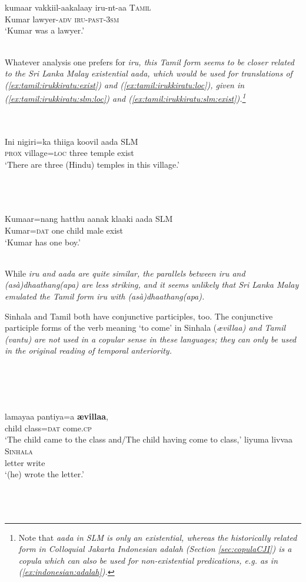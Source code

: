 \documentclass[a4paper,12pt]{article}
\newcommand{\xbox}[2]{\noindent\parbox[t]{#1}{#2}\noindent}
\newcommand{\xref}[1]{(\ref{#1})}
\newcommand{\ea}{\\\\}
\newcommand{\z}{\\\\}
\begin{document}
\xbox{\textwidth}{
\ea\label{ex:tamil:irukkiratu:adv}
\gll kumaar vakkiil-aakalaay iru-nt-aa\textipa{\textsubbar{n}} \textsc{Tamil} \\
      Kumar lawyer-\textsc{adv} \textsc{iru}-\textsc{past}-\textsc{3sm}\\
    `Kumar was a lawyer.' \citep[174]{Lehmann1989tamil}
\z
} 

Whatever analysis one prefers for \em iru\em, this Tamil form seems to be closer related to the Sri Lanka Malay existential \em aada\em, which would be used for translations of \xref{ex:tamil:irukkiratu:exist} and \xref{ex:tamil:irukkiratu:loc}, given in \xref{ex:tamil:irukkiratu:slm:loc} and \xref{ex:tamil:irukkiratu:slm:exist}.\footnote{Note that \em aada \em in SLM is only an existential, whereas the historically related form in Colloquial Jakarta Indonesian \em adalah \em (Section \ref{sec:copulaCJI}) is a copula which can also be used for non-existential predications, e.g. as in \xref{ex:indonesian:adalah}.}


\xbox{\textwidth}{
\ea\label{ex:tamil:irukkiratu:slm:loc}
\gll Ini nigiri=ka thiiga koovil aada \textsc{SLM} \\
     \textsc{prox} village=\textsc{loc} three temple exist  \\
    `There are three (Hindu) temples in this village.'
\z
} 


\xbox{\textwidth}{
\ea\label{ex:tamil:irukkiratu:slm:exist}
\gll  Kumaar=nang hatthu aanak klaaki aada \textsc{SLM} \\
      Kumar=\textsc{dat} one child male exist \\
    `Kumar has one boy.' 
\z
} 

While \em iru \em and \em aada \em are quite similar, the parallels between \em iru \em and \em (asà)dhaathang(apa) \em are less striking, and it seems unlikely that Sri Lanka Malay emulated the Tamil form \em iru \em with \em (asà)dhaa\-thang(apa).\em

Sinhala and Tamil both have conjunctive participles, too. The conjunctive participle forms of the verb meaning `to come' in Sinhala (\em \ae villaa\em) and Tamil (\em vantu\em) are not used in a copular sense in these languages; they can only be used in the original reading of temporal anteriority.


\xbox{\textwidth}{
\ea
\ea
\gll  lamayaa pantiya=\dott a \textbf{\ae villaa},\\
 child class=\textsc{dat}  come.\textsc{cp}\\
`The child came to the class and/The child having come to class,'
\ex 
\gll liyuma livvaa \textsc{Sinhala}\\
      letter write\\
     `(he) wrote the letter.' \citep[161]{Karunatillake2004}
\z
\z
} 
\end{document}
